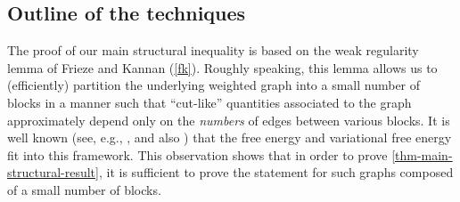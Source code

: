 \documentclass[final, 12pt]{colt2018}
\theoremstyle{definition}
\newtheorem{remark}[theorem]{Remark}
\theoremstyle{plain}
\begin{document}



\subsection{Outline of the techniques}
\begin{comment}
To illustrate the main reason for the intractability of the (log) partition
function of an Ising model, we consider the ferromagnetic case where
$\Pr[X=x]=\frac{1}{Z}\exp\{\sum_{i,j}J_{i,j}x_{i}x_{j}\}$, $J_{i,j}\geq0$.
In this case, it is clear that a given \emph{magnetized} state $x$, 
where almost all of the spins are either $+1$ or $-1$, is more likely than a given \emph{unmagnetized }state $y$, where the spins are almost evenly split between $+1$ and $-1$. However, since the number of states with exactly $\alpha n$ spins equal to $+1$ is simply ${n \choose \alpha n}$, we see that the total number of strongly magnetized states is exponentially
smaller than the total number of unmagnetized states. Therefore, while
any given unmagnetized state is less likely than any given magnetized
state, it may very well be the case that the \emph{total} probability
of the system being in an unmagnetized state is greater than that
of the system being in a magnetized state.
\end{comment}

The proof of our main structural inequality is based on the weak regularity lemma of Frieze and Kannan (\cref{fk}). Roughly speaking, this lemma allows us to (efficiently) partition the underlying weighted graph into a small number of blocks in a manner such that ``cut-like'' quantities associated to the graph approximately depend only on the \emph{numbers} of edges between various blocks. It is well known (see, e.g., \citet{borgs2012convergent}, and also ) that the free energy and variational free energy fit into this framework. This observation shows that in order to prove \cref{thm-main-structural-result}, it is sufficient to prove the statement for such graphs composed of a small number of blocks.
\end{document}
